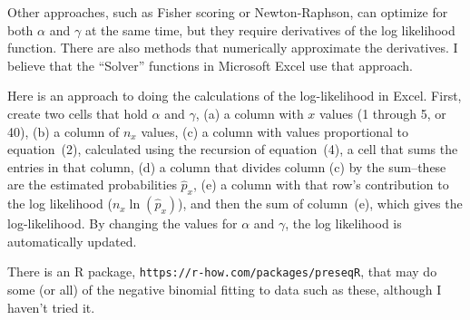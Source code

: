 Other approaches, such as Fisher scoring or Newton-Raphson, can optimize for both $\alpha$ and $\gamma$ at the same time, but they require derivatives of the log likelihood function.  There are also methods that numerically approximate the derivatives.  I believe that the ``Solver'' functions in Microsoft Excel use that approach.

Here is an approach to doing the calculations of the log-likelihood in Excel. First, create two cells that hold $\alpha$ and $\gamma$, (a) a column with $x$ values (1 through 5, or 40), (b) a column of $n_x$ values, (c) a column with values proportional to equation~(2), calculated using the recursion of equation~(4), a cell that sums the entries in that column, (d) a column that divides column (c) by the sum--these are the estimated probabilities $\hat p_x$, (e) a column with that row's contribution to the log likelihood ($n_x \ln(\hat p_x)$), and then the sum of column~(e), which gives the log-likelihood.  By changing the values for $\alpha$ and $\gamma$, the log likelihood is automatically updated.

There is an {R} package, \texttt{https://r-how.com/packages/preseqR}, that may do some (or all) of the negative binomial fitting to data such as these, although I haven't tried it.
